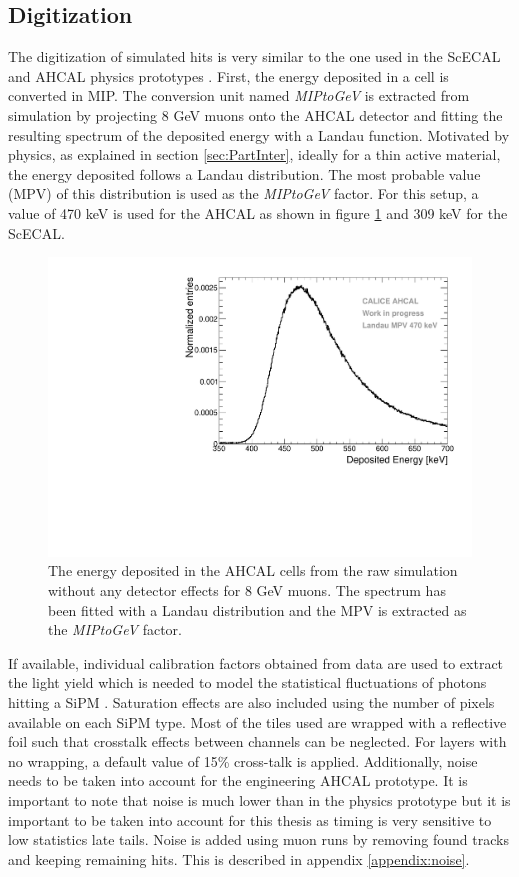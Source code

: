 \subsection{Digitization}
\label{subsec:Digitization}

The digitization of simulated hits is very similar to the one used in the ScECAL and AHCAL physics prototypes \cite{2011_JINST_6_P04003}. First, the energy deposited in a cell is converted in MIP. The conversion unit named \textit{MIPtoGeV} is extracted from simulation by projecting 8 GeV muons onto the AHCAL detector and fitting the resulting spectrum of the deposited energy with a Landau function. Motivated by physics, as explained in section \ref{sec:PartInter}, ideally for a thin active material, the energy deposited follows a Landau distribution. The most probable value (MPV) of this distribution is used as the \textit{MIPtoGeV} factor. For this setup, a value of 470 keV is used for the AHCAL as shown in figure \ref{fig:landau_MPV} and 309 keV for the ScECAL.

\begin{figure}[htbp!]
  \centering
  \includegraphics[width=0.5\linewidth]{chap4/fig/Landau_mu_HCAL.pdf}
  \caption{The energy deposited in the AHCAL cells from the raw simulation without any detector effects for 8 GeV muons. The spectrum has been fitted with a Landau distribution and the MPV is extracted as the \textit{MIPtoGeV} factor.} \label{fig:landau_MPV}
\end{figure}

If available, individual calibration factors obtained from data are used to extract the light yield which is needed to model the statistical fluctuations of photons hitting a SiPM \cite{Hartbrich:2016bbz}. Saturation effects are also included using the number of pixels available on each SiPM type. Most of the tiles used are wrapped with a reflective foil such that crosstalk effects between channels can be neglected. For layers with no wrapping, a default value of 15\% cross-talk is applied. Additionally, noise needs to be taken into account for the engineering AHCAL prototype. It is important to note that noise is much lower than in the physics prototype but it is important to be taken into account for this thesis as timing is very sensitive to low statistics late tails. Noise is added using muon runs by removing found tracks and keeping remaining hits. This is described in appendix \ref{appendix:noise}.

